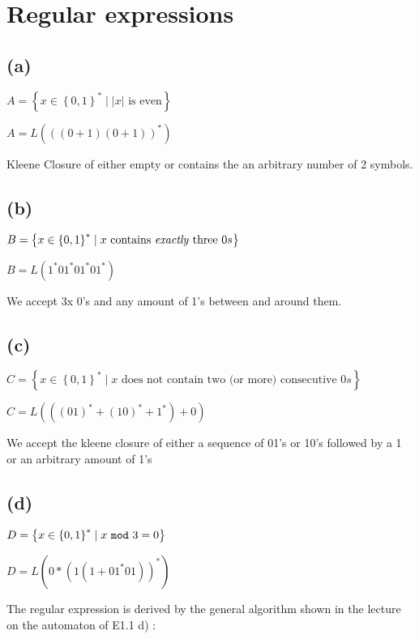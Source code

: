 



\section{Regular expressions}

\subsection{(a)}

$A = \left\{ x \in \left\{0,1\right\} ^{*} \mid \lvert x \rvert \text{ is even} \right\}$

$A = L(((0+1)(0+1))^*)$

Kleene Closure of either empty or contains the an arbitrary number of 2 symbols.

\subsection{(b)}

$B = \left\{ x \in \left\{0,1\right\} ^{*} \mid x \text{ contains \textit{exactly} three } 0s \right\}$

$B = L(1^*01^*01^*01^*)$

We accept 3x 0's and any amount of 1's between and around them.

\subsection{(c)}

$C = \left\{ x \in \left\{0,1\right\} ^{*} \mid x \text{ does not contain two (or more) consecutive } 0s \right\}$

$C = L(((01)^*+(10)^*+1^*) + 0)$

We accept the kleene closure of either a sequence of 01's or 10's followed by a 1 or an arbitrary amount of 1's 
\subsection{(d)}

$D = \left\{ x \in \left\{0,1\right\} ^{*} \mid x \text{ \texttt{mod} } 3 = 0 \right\}$

$D = L(0*(1(1+01^*01))^*)$

The regular expression is derived by the general algorithm shown in the lecture on the automaton of E1.1 d) :


